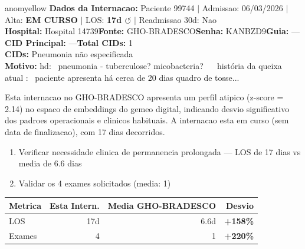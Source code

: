 \documentclass[a4paper,10pt]{article}
\begin{document}
\begin{anomalycard}[Internacao 120314 | GHO-BRADESCO | MODERADO (z=2.14)]{anomyellow}
\textbf{Dados da Internacao:} Paciente 99744 $\mid$ Admissao: 06/03/2026 $\mid$ Alta: \textcolor{anomorange}{\textbf{EM CURSO}} $\mid$ LOS: \textbf{17d \textcolor{anomorange}{$\circlearrowleft$}} $\mid$ Readmissao 30d: Nao\\
\textbf{Hospital:} Hospital 14739\quad\textbf{Fonte:} GHO-BRADESCO\quad\textbf{Senha:} KANBZD9\quad\textbf{Guia:} ---\\
\textbf{CID Principal:} {\small ---}\quad\textbf{Total CIDs:} 1\\

\textbf{CIDs:} {\scriptsize Pneumonia não especificada}\\

\textbf{Motivo:} {\scriptsize hd:  pneumonia - tuberculose? micobacteria?    história da queixa atual :  paciente apresenta há cerca de 20 dias quadro de tosse...}\\

\vspace{2pt}\begin{tcolorbox}[colback=severityred!20,colframe=anomyellow,title={\textbf{Interpretacao de Negocio}},fonttitle=\bfseries\small,left=4pt,right=4pt,top=3pt,bottom=3pt]
{\small Esta internacao no GHO-BRADESCO apresenta um perfil atipico (z-score = 2.14) no espaco de embeddings do gemeo digital, indicando desvio significativo dos padroes operacionais e clinicos habituais. A internacao esta em curso (sem data de finalizacao), com 17 dias decorridos.}
\end{tcolorbox}
\begin{tcolorbox}[colback=severityyellow!30,colframe=anomorange,title={\textbf{Recomendacoes Especificas}},fonttitle=\bfseries\small,left=4pt,right=4pt,top=3pt,bottom=3pt]
\begin{enumerate}[nosep,leftmargin=16pt]
\item {\small Verificar necessidade clinica de permanencia prolongada --- LOS de 17 dias vs media de 6.6 dias}
\item {\small Validar os 4 exames solicitados (media: 1)}
\end{enumerate}
\end{tcolorbox}
\begin{center}\begin{tabular}{l r r r}\toprule\textbf{Metrica} & \textbf{Esta Intern.} & \textbf{Media GHO-BRADESCO} & \textbf{Desvio} \\\midrule
LOS & 17d & 6.6d & \textcolor{anomred}{\textbf{+158\%}} \\
Exames & 4 & 1 & \textcolor{anomred}{\textbf{+220\%}} \\
\bottomrule\end{tabular}\end{center}


\end{anomalycard}
\end{document}
